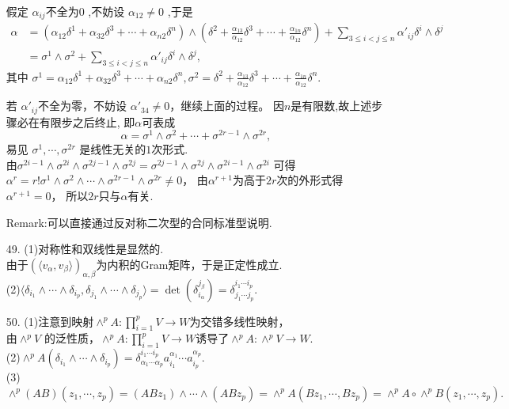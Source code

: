 \begin{itemize}
    假定 $ \alpha_{ij} $不全为$0$ ,不妨设 $ \alpha_ {12} \neq 0$ ,于是\\
     \begin{align*}\alpha&=( \alpha_ {12} \delta ^ {1}  +  \alpha _ {32}  \delta ^ {3}  +  \cdots +  \alpha _ {n2}  \delta^ {n}  )  \wedge  (\delta ^ {2}+\frac{\alpha _ {13}}{\alpha _ {12}}\delta^3 + \cdots  + \frac{\alpha _{1n}}{\alpha _{12}}\delta^ {n}) + \sum \limits_{3\leq i<j\leq n}\alpha '_ {ij} \delta^i \wedge  \delta^j\\
     &=  \sigma ^ {1} \wedge \sigma ^ {2}  +  \sum _{3\leq i<j\leq n} \alpha'_{ij} \delta^i \wedge  \delta ^j,\end{align*}
     其中
    $\displaystyle{\sigma ^ {1} = \alpha_ {12} \delta ^ {1}  +  \alpha _ {32}  \delta ^ {3}  +  \cdots +  \alpha _ {n2}  \delta^ {n}, 
    \sigma^2=\delta ^ {2}+\frac{\alpha _ {13}}{\alpha _ {12}}\delta^3 + \cdots  + \frac{\alpha _ {1n}}{\alpha _ {12}}\delta^ {n}}$.

     若 $ \alpha'_{ij} $不全为零，不妨设 $ \alpha '_{34} \neq  0$，继续上面的过程。
     因$n$是有限数,故上述步骤必在有限步之后终止, 即$\alpha$可表成
     $$ \alpha= \sigma ^ {1}  \wedge \sigma ^ {2}  +  \cdots + \sigma ^ {2r-1} \wedge  \sigma ^ {2r} ,$$ 
     易见 $ \sigma ^ {1} ,\cdots , \sigma ^ {2r} $ 是线性无关的$1$次形式.\\
     由$\sigma^{2i-1}\wedge\sigma^{2i}\wedge\sigma^{2j-1}\wedge\sigma^{2j}
     =\sigma^{2j-1}\wedge\sigma^{2j}\wedge\sigma^{2i-1}\wedge\sigma^{2i}$
     可得$\alpha^r=r!\sigma^1\wedge\sigma^2\wedge\cdots\wedge\sigma^{2r-1}\wedge\sigma^{2r}\neq0$，
     由$\alpha^{r+1}$为高于$2r$次的外形式得$\alpha^{r+1}=0$，
     所以$2r$只与$\alpha$有关.
     
     Remark:可以直接通过反对称二次型的合同标准型说明.

    \item[49.]
    (1)对称性和双线性是显然的.\\
    由于$(\langle v_\alpha,v_\beta\rangle)_{\alpha,\beta}$为内积的Gram矩阵，于是正定性成立.\\
    (2)$\langle\delta _ {i_1}\wedge\cdots\wedge \delta_{i_p},\delta_{j_1}\wedge\cdots\wedge \delta_{j_p}\rangle
    =\det(\delta_{i_\alpha}^{j_\beta})
    =\delta_{j_1\cdots j_p}^{i_1\cdots i_p}.$\\

    \item[50.]
    (1)注意到映射$ \wedge^pA:\prod\limits_{i=1}^pV \rightarrow W$为交错多线性映射，\\
    由$ \wedge ^pV$  的泛性质，$ \wedge^pA:\prod\limits_{i=1}^pV \rightarrow W$诱导了$ \wedge  ^pA:\wedge^pV \rightarrow W$.\\
    
    (2)$\wedge^pA(\delta_{i_1}\wedge\cdots\wedge\delta_{i_p})=
    \delta_{\alpha_1\cdots\alpha_p}^{i_1\cdots i_p}a_{i_1}^{\alpha_1}\cdots a_{i_p}^{\alpha_p}.$\\
    
    (3)$\wedge^p(AB)(z_1,\cdots,z_p)=(ABz_1)\wedge\cdots\wedge(ABz_p)=\wedge^pA(Bz_1,\cdots,Bz_p)=\wedge^pA\circ\wedge ^pB(z_1,\cdots ,z_p).$
\end{itemize}